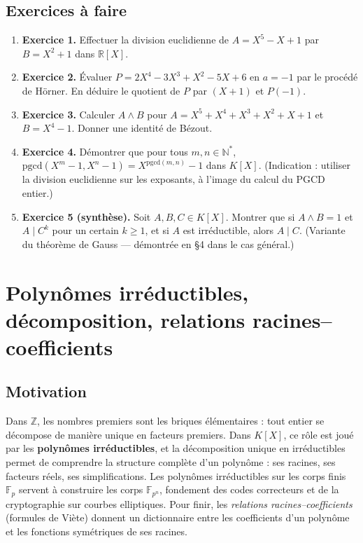\subsection{Exercices à faire}
\begin{enumerate}
    \item \textbf{Exercice 1.} Effectuer la division euclidienne de $A = X^5 - X + 1$ par $B = X^2 + 1$ dans $\mathbb{R}[X]$.
    \item \textbf{Exercice 2.} Évaluer $P = 2X^4 - 3X^3 + X^2 - 5X + 6$ en $a = -1$ par le procédé de Hörner. En déduire le quotient de $P$ par $(X + 1)$ et $P(-1)$.
    \item \textbf{Exercice 3.} Calculer $A \wedge B$ pour $A = X^5 + X^4 + X^3 + X^2 + X + 1$ et $B = X^4 - 1$. Donner une identité de Bézout.
    \item \textbf{Exercice 4.} Démontrer que pour tous $m, n \in \mathbb{N}^*$, $\mathrm{pgcd}(X^m - 1, X^n - 1) = X^{\mathrm{pgcd}(m, n)} - 1$ dans $K[X]$. (Indication : utiliser la division euclidienne sur les exposants, à l'image du calcul du PGCD entier.)
    \item \textbf{Exercice 5 (synthèse).} Soit $A, B, C \in K[X]$. Montrer que si $A \wedge B = 1$ et $A \mid C^k$ pour un certain $k \ge 1$, et si $A$ est irréductible, alors $A \mid C$. (Variante du théorème de Gauss --- démontrée en §4 dans le cas général.)
\end{enumerate}

\section{Polynômes irréductibles, décomposition, relations racines--coefficients}

\subsection{Motivation}
Dans $\mathbb{Z}$, les nombres premiers sont les briques élémentaires : tout entier se décompose de manière unique en facteurs premiers. Dans $K[X]$, ce rôle est joué par les \textbf{polynômes irréductibles}, et la décomposition unique en irréductibles permet de comprendre la structure complète d'un polynôme : ses racines, ses facteurs réels, ses simplifications. Les polynômes irréductibles sur les corps finis $\mathbb{F}_p$ servent à construire les corps $\mathbb{F}_{p^n}$, fondement des codes correcteurs et de la cryptographie sur courbes elliptiques. Pour finir, les \emph{relations racines--coefficients} (formules de Viète) donnent un dictionnaire entre les coefficients d'un polynôme et les fonctions symétriques de ses racines.

